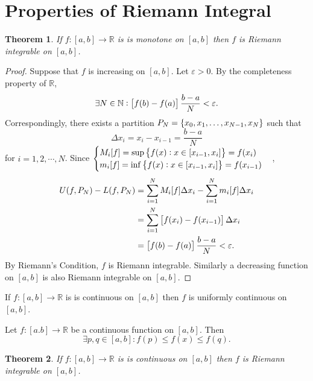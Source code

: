 \documentclass[12pt,openany]{book}
\newtheorem{theorem}{Theorem}[chapter]
\theoremstyle{definition}
\newcommand{\N}{\mathbb{N}}
\newcommand{\R}{\mathbb{R}}
\begin{document}
	\section{Properties of Riemann Integral}
	\begin{tcolorbox}[colframe=thmcolor, title={\color{white}\bf }]
		\begin{theorem}
			If \(f:[a,b]\to\R\) is is monotone on \([a,b]\) then \(f\) is Riemann integrable on \([a,b]\).
		\end{theorem}
	\end{tcolorbox}
	\begin{proof}
		Suppose that \(f\) is increasing on \([a,b]\). Let \(\varepsilon>0\). By the completeness property of \(\R\), \[
		\exists N\in\N:\sbr{f(b)-f(a)}\frac{b-a}{N}<\varepsilon.
		\] Correspondingly, there exists a partition \(P_N=\set{x_0,x_1,\dots,x_{N-1},x_N}\) such that \[
		\Delta x_i=x_i-x_{i-1}=\frac{b-a}{N}
		\] for \(i=1,2,\cdots,N\). Since \(\begin{cases}
			M_i[f]=\sup\set{f(x):x\in[x_{i-1},x_i]}=f(x_i)\\
			m_i[f]=\inf\set{f(x):x\in[x_{i-1},x_i]}=f(x_{i-1})
		\end{cases}\), \begin{align*}
		U(f,P_N)-L(f,P_N)&=\sum_{i=1}^NM_i[f]\Delta x_i-\sum_{i=1}^Nm_i[f]\Delta x_i\\
		&=\sum_{i=1}^N\sbr{f(x_i)-f(x_{i-1})}\Delta x_i\\
		&=\sbr{f(b)-f(a)}\frac{b-a}{N}<\varepsilon.
	\end{align*} By Riemann's Condition, \(f\) is Riemann integrable. Similarly a decreasing function on \([a,b]\) is also Riemann integrable on \([a,b]\).
	\end{proof}
	\vspace{8pt}
	\begin{tcolorbox}[colframe=thmcolor!50!, title={\color{white}\bf Uniform Continuity Theorem}]
			If \(f:[a,b]\to\R\) is is continuous on \([a,b]\) then \(f\) is uniformly continuous on \([a,b]\).
	\end{tcolorbox}
	\begin{tcolorbox}[colframe=thmcolor!50!, title={\color{white}\bf Maximum-Minimum Theorem}]
		Let \(f:[a.b]\to\R\) be a continuous function on \([a,b]\). Then \[
		\exists p,q\in[a,b]:f(p)\leq f(x)\leq f(q).
		\]
	\end{tcolorbox}
	\begin{tcolorbox}[colframe=thmcolor, title={\color{white}\bf }]
		\begin{theorem}
			If \(f:[a,b]\to\R\) is is continuous on \([a,b]\) then \(f\) is Riemann integrable on \([a,b]\).
		\end{theorem}
	\end{tcolorbox}
\end{document}
